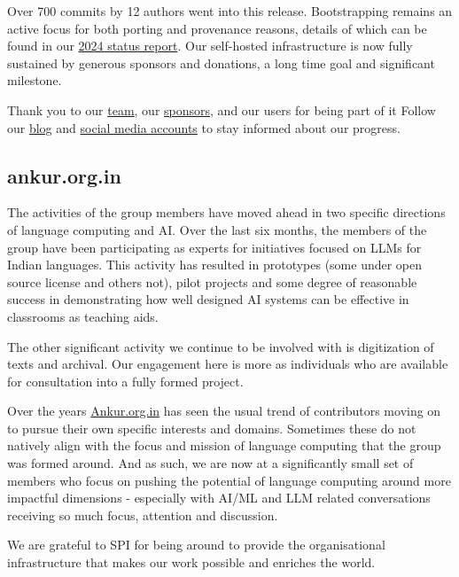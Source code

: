 \documentclass[a4paper]{report}
\begin{document}
Over 700 commits by 12 authors went into this release. Bootstrapping remains an active focus for both porting and provenance reasons, details of which can be found in our \href{https://blog.adelielinux.org/2024/12/24/2024-state-of-the-adelie-linux-distribution/}{2024 status report}.
Our self-hosted infrastructure is now fully sustained by generous sponsors and donations, a long time goal and significant milestone.

Thank you to our \href{https://git.adelielinux.org/groups/adelie/-/group_members}{team}, our \href{https://www.adelielinux.org/sponsors/}{sponsors}, and our users for being part of it Follow our \href{https://blog.adelielinux.org/}{blog} and \href{https://www.adelielinux.org/contact/}{social media accounts} to stay informed about our progress.

\subsection{ankur.org.in}

The activities of the group members have moved ahead in two specific directions of language computing and AI. Over the last six months, the members of the group have been participating as experts for initiatives focused on LLMs for Indian languages. This activity has resulted in prototypes (some under open source license and others not), pilot projects and some degree of reasonable success in demonstrating how well designed AI systems can be effective in classrooms as teaching aids.

The other significant activity we continue to be involved with is digitization of texts and archival. Our engagement here is more as individuals who are available for consultation into a fully formed project.

Over the years \href{https://ankur.org.in/}{Ankur.org.in} has seen the usual trend of contributors moving on to pursue their own specific interests and domains. Sometimes these do not natively align with the focus and mission of language computing that the group was formed around. And as such, we are now at a significantly small set of members who focus on pushing the potential of language computing around more impactful dimensions - especially with AI/ML and LLM related conversations receiving so much focus, attention and discussion.

We are grateful to SPI for being around to provide the organisational infrastructure that makes our work possible and enriches the world.
\end{document}
